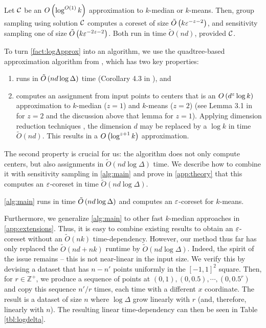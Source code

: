 \begin{fact}\label{fact:logApprox}
Let $\mathcal C$ be an $O\left( \log^{O(1)} k\right)$ approximation to $k$-median or $k$-means.
Then, group sampling using solution $\mathcal C$ computes a coreset of size $\tilde O\left(
k \varepsilon^{-z-2}\right)$, and sensitivity sampling one of size $\tilde O\left( k \varepsilon^{-2z-2}\right)$. 
Both run in time $\tilde O(nd)$, provided $\mathcal C$.
\end{fact}

To turn \cref{fact:logApprox} into an algorithm, we use the quadtree-based \fkmeans approximation algorithm from \cite{cohen2020fast}, which has two key
properties: 
\begin{enumerate}
\item \fkmeans runs in $\tilde O\left( n d \log \Delta\right)$ time (Corollary 4.3 in \cite{cohen2020fast}), and
\item \fkmeans computes an assignment from input points to centers that is an $O\left( d^z \log k\right)$ approximation to $k$-median ($z=1$) and $k$-means ($z=2$)
    (see Lemma 3.1 in \cite{cohen2020fast} for $z=2$ and the discussion above that lemma for $z=1$). Applying dimension reduction techniques \cite{MakarychevMR19}, the dimension
    $d$ may be replaced by a $\log k$ in time $\tilde O(nd)$. This results in a $O\left(\log^{z+1} k\right)$ approximation. 
\end{enumerate}

The second property is crucial for us: the algorithm does not only compute centers, but also assignments in $\tilde{O}(nd\log \Delta)$ time.  We describe how to
combine it with sensitivity sampling in \cref{alg:main} and prove in \cref{app:theory} that this computes an $\varepsilon$-coreset in time $\tilde O(nd \log \Delta)$.

\begin{corollary}\label{cor:mainAlg}
\cref{alg:main} runs in time $\tilde O\left( n d \log \Delta\right)$ and computes an $\varepsilon$-coreset for $k$-means.
\end{corollary}
Furthermore, we generalize \cref{alg:main} to other fast $k$-median approaches in \cref{app:extensions}.
Thus, it is easy to combine existing results to obtain an $\varepsilon$-coreset without an $\tilde{O}(nk)$ time-dependency.  However, our method thus far has only
replaced the $\tilde{O}(nd + nk)$ runtime by $\tilde{O}(nd \log \Delta)$. Indeed, the spirit of the issue remains -- this is not near-linear in the input size.
We verify this by devising a dataset that has $n - n'$ points uniformly in the $[-1, 1]^2$ square. Then, for $r \in \mathbb{Z}^+$, we produce a sequence of
points at $(0, 1), (0, 0.5), \cdots, (0, 0.5^r)$ and copy this sequence $n' / r$ times, each time with a different $x$ coordinate. The result is a dataset of
size $n$ where $\log \Delta$ grow linearly with $r$ (and, therefore, linearly with $n$). The resulting linear time-dependency can then be seen in Table \ref{tbl:logdelta}.

